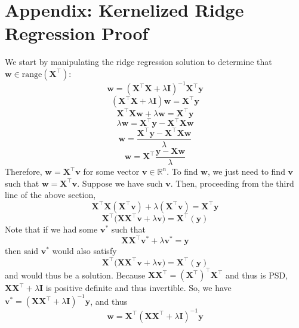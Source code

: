 \documentclass{article}
\begin{document}
\section*{Appendix: Kernelized Ridge Regression Proof}
We start by manipulating the ridge regression solution to determine that $\mathbf{w} \in \text{range}(\mathbf{X^{\top}})$: $$ \mathbf{w} = (\mathbf{X^{\top}X} + \lambda\mathbf{I})^{-1}\mathbf{X^{\top}y}$$ $$(\mathbf{X^{\top}X} + \lambda\mathbf{I})\mathbf{w} = \mathbf{X^{\top}y}$$ $$\mathbf{X^{\top}Xw} + \lambda\mathbf{w} = \mathbf{X^{\top}y}$$ $$\lambda\mathbf{w} = \mathbf{X^{\top}y - X^{\top}Xw}$$ $$\mathbf{w} = \frac{\mathbf{X^{\top}y - X^{\top}Xw}}{\lambda}$$ $$\mathbf{w} = \mathbf{X^{\top}}\frac{\mathbf{y - Xw}}{\lambda}$$ Therefore, $\mathbf{w} = \mathbf{X^{\top}v}$ for some vector $\mathbf{v} \in \mathbb{R}^n$. To find $\mathbf{w}$, we just need to find $\mathbf{v}$ such that $\mathbf{w = X^{\top}v}$. Suppose we have such $\mathbf{v}$. Then, proceeding from the third line of the above section, $$\mathbf{X^{\top}X(X^{\top}v)} + \lambda(\mathbf{X^{\top}v}) = \mathbf{X^{\top}y}$$ $$\mathbf{X^{\top}(XX^{\top}v} + \lambda\mathbf{v) = X^{\top}(y)}$$ Note that if we had some $\mathbf{v^*}$ such that $$\mathbf{XX^{\top}v^*} + \lambda\mathbf{v^* = y}$$ then said $\mathbf{v^*}$ would also satisfy $$\mathbf{X^{\top}(XX^{\top}v} + \lambda\mathbf{v) = X^{\top}(y)}$$ and would thus be a solution. Because $\mathbf{XX^{\top}} = \mathbf{(X^{\top})^{\top}X^{\top}}$ and thus is PSD, $\mathbf{XX^{\top}} + \lambda\mathbf{I}$ is positive definite and thus invertible. So, we have $\mathbf{v^*} = (\mathbf{XX^{\top}} + \lambda\mathbf{I})^{-1}\mathbf{y}$, and thus $$\mathbf{w} = \mathbf{X^{\top}}(\mathbf{XX^{\top}} + \lambda\mathbf{I})^{-1}\mathbf{y}$$
\end{document}
